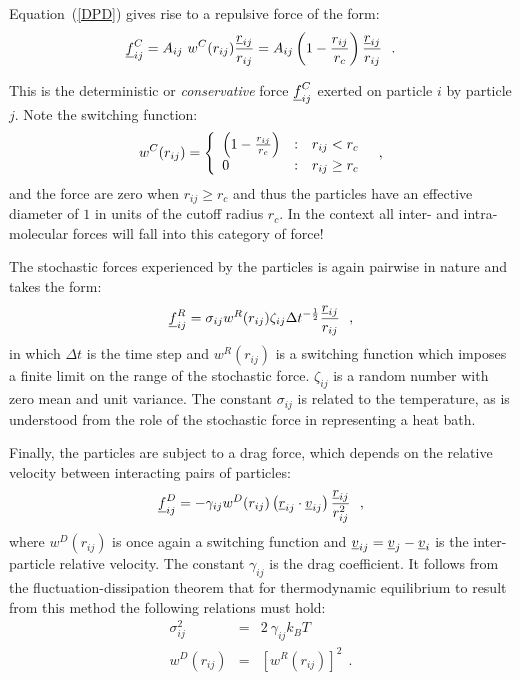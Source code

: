 Equation~(\ref{DPD}) gives rise to a repulsive force of the form:
\begin{equation}
\mbox{$\underline{f}$}_{ij}^{C} = A_{ij}~w^{C}(r_{ij}) \frac{\mbox{$\underline{r}$}_{ij}}{r_{ij}} =
A_{ij} \left( 1 - \frac{r_{ij}}{r_{c}} \right) \frac{\mbox{$\underline{r}$}_{ij}}{r_{ij}}~~. \label{DPDF}
\end{equation}

This is the deterministic or \emph{conservative} force $\mbox{$\underline{f}$}_{ij}^{C}$ exerted
on particle $i$ by particle $j$.  Note the switching function:
\begin{equation}
w^{C}(r_{ij}) = \left\{ \begin{array} {l@{\quad:\quad}l}
\left(1-\frac{r_{ij}}{r_{c}}\right) & r_{ij} < r_{c} \\
0 & r_{ij} \ge r_{c} \end{array} \right.~~, \label{DPDS}
\end{equation}
and the force are zero when $r_{ij} \ge r_{c}$ and thus the particles have an effective
diameter of $1$ in units of the cutoff radius $r_{c}$.  In the \D context all inter-
and intra-molecular forces will fall into this category of force!

The stochastic forces experienced by the particles is again pairwise in nature
and takes the form:
\begin{equation}
\mbox{$\underline{f}$}_{ij}^{R} = \sigma_{ij} w^{R}(r_{ij}) \zeta_{ij} \Delta t^{-\frac{1}{2}} \frac{\mbox{$\underline{r}$}_{ij}}{r_{ij}}~~,
\end{equation}
in which $\Delta t$ is the time step and $w^{R}(r_{ij})$ is a switching function
which imposes a finite limit on the range of the stochastic force.  $\zeta_{ij}$
is a random number with zero mean and unit variance.  The constant $\sigma_{ij}$
is related to the temperature, as is understood from the role of the stochastic
force in representing a heat bath.

Finally, the particles are subject to a drag force, which depends on the relative
velocity between interacting pairs of particles:
\begin{equation}
\mbox{$\underline{f}$}_{ij}^{D} = -\gamma_{ij} w^{D}(r_{ij})
\left(\mbox{$\underline{r}$}_{ij} \cdot \mbox{$\underline{v}$}_{ij}\right) \frac{\mbox{$\underline{r}$}_{ij}}{r_{ij}^2}~~,
\end{equation}
where $w^{D}(r_{ij})$ is once again a switching function and
$\mbox{$\underline{v}$}_{ij} = \mbox{$\underline{v}$}_{j}-\mbox{$\underline{v}$}_{i}$ is the inter-particle relative velocity.
The constant $\gamma_{ij}$ is the drag coefficient.  It follows from the
fluctuation-dissipation theorem that for thermodynamic equilibrium to
result from this method the following relations must hold:
\begin{eqnarray}
\sigma_{ij}^2 &=& 2~\gamma_{ij} k_{B} T \label{DPDC1} \\
w^{D}(r_{ij}) &=& \left[w^{R}(r_{ij})\right]^{2}~~. \label{DPDC2}
\end{eqnarray}

